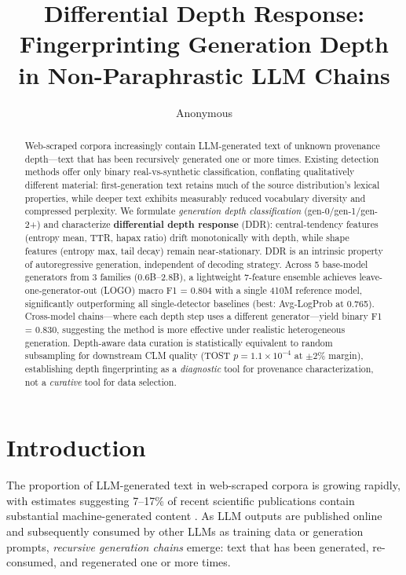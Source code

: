 \documentclass[11pt]{article}
\title{Differential Depth Response: Fingerprinting Generation Depth\\in Non-Paraphrastic LLM Chains}
\author{Anonymous}
\begin{document}
\maketitle

\begin{abstract}
Web-scraped corpora increasingly contain LLM-generated text of unknown provenance depth---text that has been recursively generated one or more times. Existing detection methods offer only binary real-vs-synthetic classification, conflating qualitatively different material: first-generation text retains much of the source distribution's lexical properties, while deeper text exhibits measurably reduced vocabulary diversity and compressed perplexity. We formulate \emph{generation depth classification} (gen-0/gen-1/gen-2+) and characterize \textbf{differential depth response} (DDR): central-tendency features (entropy mean, TTR, hapax ratio) drift monotonically with depth, while shape features (entropy max, tail decay) remain near-stationary. DDR is an intrinsic property of autoregressive generation, independent of decoding strategy. Across 5 base-model generators from 3 families (0.6B--2.8B), a lightweight 7-feature ensemble achieves leave-one-generator-out (LOGO) macro F1 = 0.804 with a single 410M reference model, significantly outperforming all single-detector baselines (best: Avg-LogProb at 0.765). Cross-model chains---where each depth step uses a different generator---yield binary F1 = 0.830, suggesting the method is more effective under realistic heterogeneous generation. Depth-aware data curation is statistically equivalent to random subsampling for downstream CLM quality (TOST $p = 1.1 \times 10^{-4}$ at $\pm$2\% margin), establishing depth fingerprinting as a \emph{diagnostic} tool for provenance characterization, not a \emph{curative} tool for data selection.
\end{abstract}

\section{Introduction}
\label{sec:intro}

The proportion of LLM-generated text in web-scraped corpora is growing rapidly, with estimates suggesting 7--17\% of recent scientific publications contain substantial machine-generated content \cite{liang2024monitoring}. As LLM outputs are published online and subsequently consumed by other LLMs as training data or generation prompts, \emph{recursive generation chains} emerge: text that has been generated, re-consumed, and regenerated one or more times.
\end{document}
